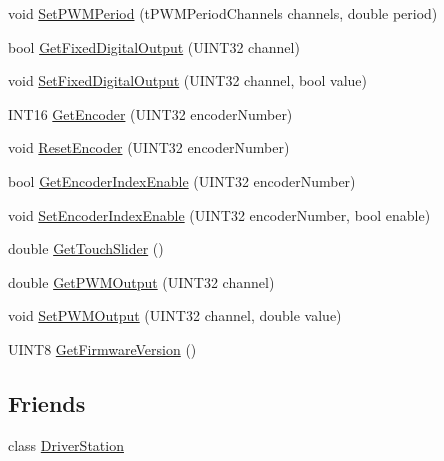 \begin{DoxyCompactItemize}
\item 
void \hyperlink{classDriverStationEnhancedIO_a6f1c7196f6cbcce00a928d7380b9d46f}{SetPWMPeriod} (tPWMPeriodChannels channels, double period)
\item 
bool \hyperlink{classDriverStationEnhancedIO_aee619374b9c5f1135682bda584ec146c}{GetFixedDigitalOutput} (UINT32 channel)
\item 
void \hyperlink{classDriverStationEnhancedIO_a97ef0ba03c428cb102d7a8687e482f17}{SetFixedDigitalOutput} (UINT32 channel, bool value)
\item 
INT16 \hyperlink{classDriverStationEnhancedIO_a32f6f8d6b4f5969ea4f85373d5e0f1b7}{GetEncoder} (UINT32 encoderNumber)
\item 
void \hyperlink{classDriverStationEnhancedIO_a22ca90b78c4412be888953c77f6280e6}{ResetEncoder} (UINT32 encoderNumber)
\item 
bool \hyperlink{classDriverStationEnhancedIO_a6e88a899d3cdb6e4750d37204e269f9c}{GetEncoderIndexEnable} (UINT32 encoderNumber)
\item 
void \hyperlink{classDriverStationEnhancedIO_a01d34032c4d8c282359c62c3b44f8a85}{SetEncoderIndexEnable} (UINT32 encoderNumber, bool enable)
\item 
double \hyperlink{classDriverStationEnhancedIO_a873a93d533fc36508b0315796319fd90}{GetTouchSlider} ()
\item 
double \hyperlink{classDriverStationEnhancedIO_ae98d30680867528616fee53ff90b6921}{GetPWMOutput} (UINT32 channel)
\item 
void \hyperlink{classDriverStationEnhancedIO_aa343765022e453e9be07719b3e247eb5}{SetPWMOutput} (UINT32 channel, double value)
\item 
UINT8 \hyperlink{classDriverStationEnhancedIO_af47e837e7e54536ea38e141a38192c9f}{GetFirmwareVersion} ()
\end{DoxyCompactItemize}
\subsection*{Friends}
\begin{DoxyCompactItemize}
\item 
\hypertarget{classDriverStationEnhancedIO_a8a49b196fd9fe998c84a7bee5ebe1883}{
class \hyperlink{classDriverStationEnhancedIO_a8a49b196fd9fe998c84a7bee5ebe1883}{DriverStation}}
\label{classDriverStationEnhancedIO_a8a49b196fd9fe998c84a7bee5ebe1883}

\end{DoxyCompactItemize}


